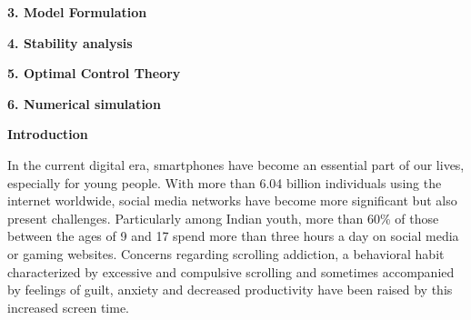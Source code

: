\documentclass[10pt]{NSP1}
\begin{document}
	
	
\par\medskip{}\smallskip

\par\medskip{}\smallskip

\par\medskip\noindent \begin{center}\large\bfseries 3. Model Formulation\end{center}\smallskip

\par\vspace{14.0pt}\noindent \begin{center}\large\bfseries 4. Stability analysis\end{center}\vspace{14.0pt}

\par\medskip\noindent \begin{center}\normalsize\bfseries 5. Optimal Control Theory\end{center}\smallskip

\par\vspace{14.0pt}\noindent \begin{center}\large\bfseries 6. Numerical simulation\end{center}\vspace{14.0pt}

\par\medskip{}\vspace{14.0pt}

\par\medskip\noindent \begin{center}\large\bfseries Introduction\end{center}\smallskip

In the current digital era, smartphones have become an essential part of our lives, especially for young people. With more than 6.04 billion individuals using the internet worldwide, social media networks have become more significant but also present challenges. Particularly among Indian youth, more than 60\% of those between the ages of 9 and 17 spend more than three hours a day on social media or gaming websites. Concerns regarding scrolling addiction, a behavioral habit characterized by excessive and compulsive scrolling and sometimes accompanied by feelings of guilt, anxiety and decreased productivity have been raised by this increased \cite{ref1, ref2, ref3, ref4, ref5, ref6, ref7, ref8, ref9, ref10} screen time.
\end{document}
